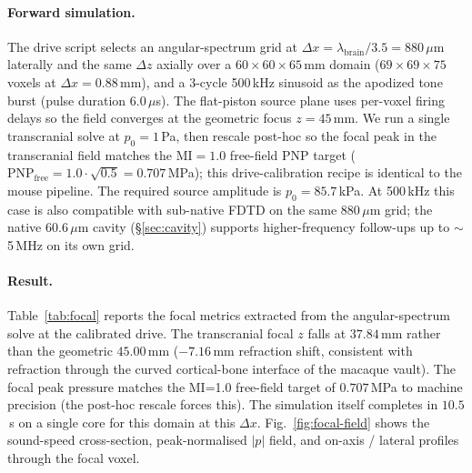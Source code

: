 \documentclass{compactarticle}
\begin{document}
\paragraph{Forward simulation.}
The drive script selects an angular-spectrum
grid at $\Delta x = \lambda_{\mathrm{brain}}/3.5 = 880$\,$\mu$m laterally
and the same $\Delta z$ axially over a
$60 \times 60 \times 65$\,mm domain
($69 \times 69 \times 75$ voxels at $\Delta x = 0.88$\,mm), and a
3-cycle 500\,kHz sinusoid as the apodized tone burst
(pulse duration $6.0$\,$\mu$s). The flat-piston source plane uses
per-voxel firing delays so the field converges at the geometric focus
$z = 45$\,mm. We run a single transcranial solve at
$p_0 = 1$\,Pa, then rescale post-hoc so the focal peak in the
transcranial field matches the
$\mathrm{MI} = 1.0$ free-field PNP target
($\mathrm{PNP}_{\mathrm{free}} = 1.0 \cdot \sqrt{0.5} = 0.707$\,MPa);
this drive-calibration recipe is identical to the mouse pipeline. The
required source amplitude is $p_0 = 85.7$\,kPa. At 500\,kHz this case
is also compatible with sub-native FDTD on the same $880$\,$\mu$m
grid; the native $60.6$\,$\mu$m cavity (\S\ref{sec:cavity}) supports
higher-frequency follow-ups up to $\sim$5\,MHz on its own grid.

\paragraph{Result.}
Table~\ref{tab:focal} reports the focal metrics extracted from the
angular-spectrum solve at the calibrated drive. The transcranial
focal $z$ falls at $37.84$\,mm rather than the geometric $45.00$\,mm
($-7.16$\,mm refraction shift, consistent with refraction through
the curved cortical-bone interface of the macaque vault). The focal
peak pressure matches the MI=1.0 free-field target of $0.707$\,MPa to
machine precision (the post-hoc rescale forces this). The simulation
itself completes in $10.5$\,s on a single core for this domain at this
$\Delta x$. Fig.~\ref{fig:focal-field} shows the sound-speed
cross-section, peak-normalised $|p|$ field, and on-axis / lateral
profiles through the focal voxel.
\end{document}

